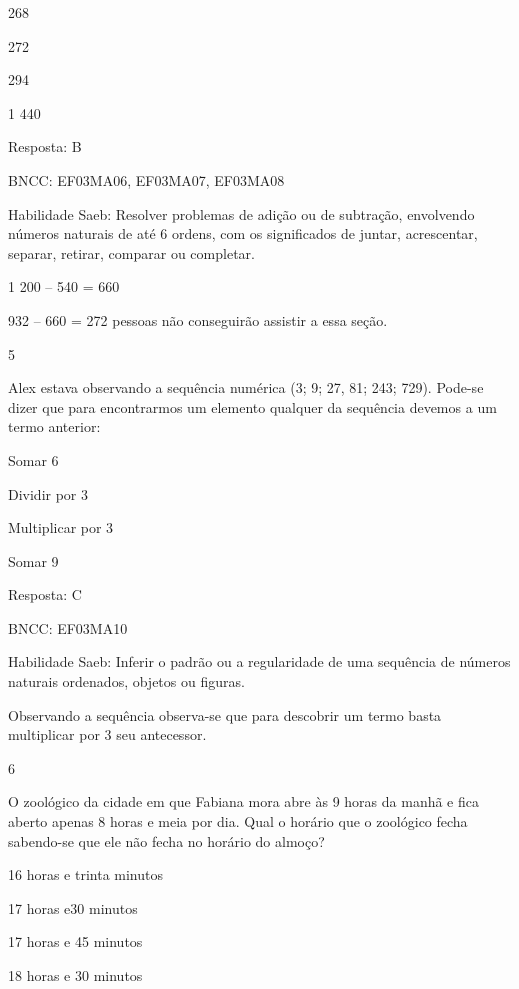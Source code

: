 \begin{escolha}
{\begin{escolha}
{\begin{escolha}
\item
  268
\item
  272
\item
  294
\item
  1 440
\end{escolha}

Resposta: B

BNCC: EF03MA06, EF03MA07, EF03MA08

Habilidade Saeb: Resolver problemas de adição ou de subtração,
envolvendo números naturais de até 6 ordens, com os significados de
juntar, acrescentar, separar, retirar, comparar ou completar.

1 200 -- 540 = 660

932 -- 660 = 272 pessoas não conseguirão assistir a essa seção.

\num{5}

Alex estava observando a sequência numérica (3; 9; 27, 81; 243; 729).
Pode-se dizer que para encontrarmos um elemento qualquer da sequência
devemos a um termo anterior:

\begin{escolha}
\item
  Somar 6
\item
  Dividir por 3
\item
  Multiplicar por 3
\item
  Somar 9
\end{escolha}

Resposta: C

BNCC: EF03MA10

Habilidade Saeb: Inferir o padrão ou a regularidade de uma sequência de
números naturais ordenados, objetos ou figuras.

Observando a sequência observa-se que para descobrir um termo basta
multiplicar por 3 seu antecessor.

\num{6}

O zoológico da cidade em que Fabiana mora abre às 9 horas da manhã e
fica aberto apenas 8 horas e meia por dia. Qual o horário que o
zoológico fecha sabendo-se que ele não fecha no horário do almoço?

\begin{escolha}
\item
  16 horas e trinta minutos
\item
  17 horas e30 minutos
\item
  17 horas e 45 minutos
\item
  18 horas e 30 minutos
\end{escolha}

}
\end{escolha}}
\end{escolha}
